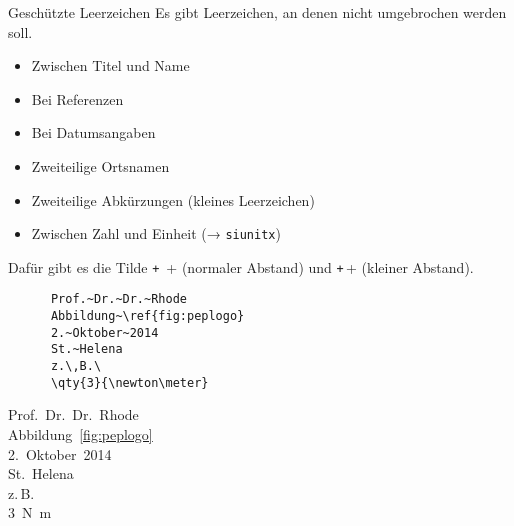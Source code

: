 \begin{frame}[fragile]{Geschützte Leerzeichen}
  Es gibt Leerzeichen, an denen nicht umgebrochen werden soll. \\
  \begin{itemize}
    \item Zwischen Titel und Name
    \item Bei Referenzen
    \item Bei Datumsangaben
    \item Zweiteilige Ortsnamen
    \item Zweiteilige Abkürzungen (kleines Leerzeichen)
    \item Zwischen Zahl und Einheit (→ \texttt{siunitx})
  \end{itemize}
  Dafür gibt es die Tilde \texttt+~+ (normaler Abstand) und \texttt+\,+ (kleiner Abstand).
  \begin{CodeExample}{0.5}
    \begin{verbatim}
      Prof.~Dr.~Dr.~Rhode
      Abbildung~\ref{fig:peplogo}
      2.~Oktober~2014
      St.~Helena
      z.\,B.\
      \qty{3}{\newton\meter}
    \end{verbatim}
    \CodeResult
      \strut
      Prof.~Dr.~Dr.~Rhode \\
      Abbildung~\ref{fig:peplogo} \\
      2.~Oktober~2014 \\
      St.~Helena \\
      z.\,B.\ \\
      \qty{3}{\newton\meter}
  \end{CodeExample}
\end{frame}

